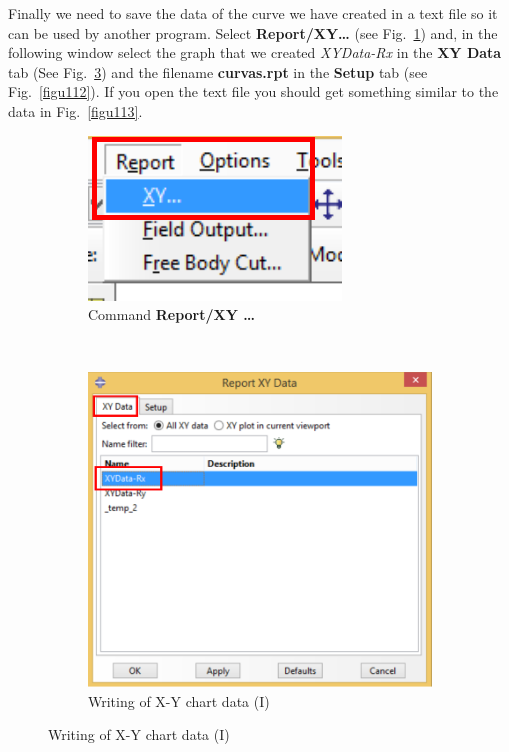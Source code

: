 \begin{enumerate}
Finally we need to save the data of the curve  we have created in
a text file so it can be used by another program. Select
\textbf{Report/XY\ldots} (see Fig.~\ref{figu110}) and, in the
following window select the graph that we created \textit {XYData-Rx}
in the \textbf {XY Data} tab (See Fig.~\ref{figu111}) and the filename
\textbf{curvas.rpt} in the \textbf {Setup} tab (see
Fig.~\ref{figu112}). If you open the text file you should get
something similar to the data in Fig.~\ref{figu113}.

\begin{figure}[H]
  \centering
  \begin{subfigure}{0.30\textwidth}
    \includegraphics[width=\textwidth]{./body/images/imagen110.pdf}
    \caption{Command \textbf{Report/XY \ldots}}
    \label{figu110}
  \end{subfigure}%
  ~ %
  \begin{subfigure}{0.50\textwidth}
    \includegraphics[width=\textwidth]{./body/images/imagen111.pdf}
    \caption{Writing of X-Y chart data (I)}
    \label{figu111}
  \end{subfigure}%
  

\end{figure}
\end{enumerate}
